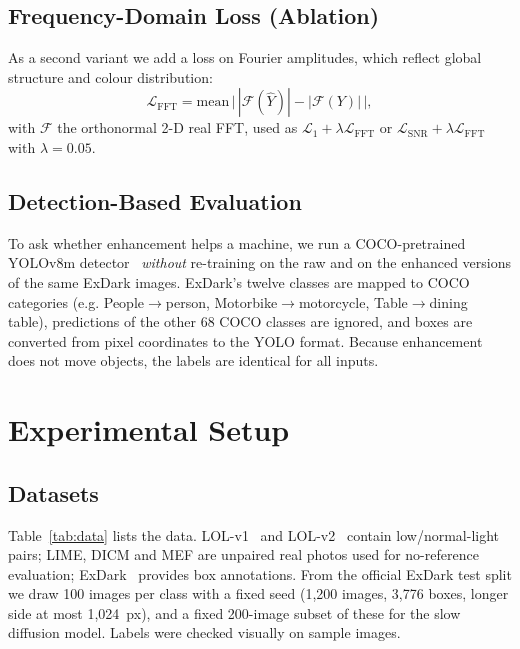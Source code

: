 \documentclass[journal]{IEEEtran}
\begin{document}
\subsection{Frequency-Domain Loss (Ablation)}
As a second variant we add a loss on Fourier amplitudes, which reflect global structure and colour distribution:
\begin{equation}
\mathcal{L}_{\mathrm{FFT}}=\mathrm{mean}\,\bigl|\,|\mathcal{F}(\hat{Y})|-|\mathcal{F}(Y)|\,\bigr|, \label{eq:fft}
\end{equation}
with $\mathcal{F}$ the orthonormal 2-D real FFT, used as $\mathcal{L}_1+\lambda\mathcal{L}_{\mathrm{FFT}}$ or
$\mathcal{L}_{\mathrm{SNR}}+\lambda\mathcal{L}_{\mathrm{FFT}}$ with $\lambda=0.05$.

\subsection{Detection-Based Evaluation}
To ask whether enhancement helps a machine, we run a COCO-pretrained YOLOv8m detector~\cite{jocher2023yolov8,lin2014coco}
\emph{without} re-training on the raw and on the enhanced versions of the same ExDark images. ExDark's twelve classes
are mapped to COCO categories (e.g. People$\rightarrow$person, Motorbike$\rightarrow$motorcycle, Table$\rightarrow$dining
table), predictions of the other 68 COCO classes are ignored, and boxes are converted from pixel coordinates to the
YOLO format. Because enhancement does not move objects, the labels are identical for all inputs.

\section{Experimental Setup}\label{sec:setup}
\subsection{Datasets}
Table~\ref{tab:data} lists the data. LOL-v1~\cite{wei2018retinexnet} and LOL-v2~\cite{yang2021lolv2} contain
low/normal-light pairs; LIME, DICM and MEF are unpaired real photos used for no-reference evaluation; ExDark~\cite{loh2019exdark}
provides box annotations. From the official ExDark test split we draw 100 images per class with a fixed seed
(1,200 images, 3,776 boxes, longer side at most 1,024~px), and a fixed 200-image subset of these for the slow
diffusion model. Labels were checked visually on sample images.
\end{document}
